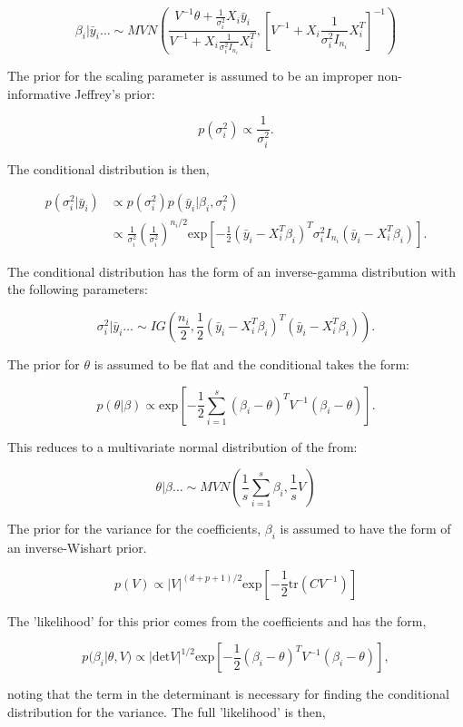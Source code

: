 \documentclass[11pt]{article}
\begin{document}
    $$\beta_i | \bar{y}_i \dots \sim MVN\left(\frac{V^{-1} \theta + \frac{1}{\sigma_i^2 }X_i \bar{y}_i }{V^{-1} + X_i \frac{1}{\sigma_i^2 I_{n_i}} X_i^T}, \left[V^{-1} + X_i \frac{1}{\sigma_i^2 I_{n_i}} X_i^T \right]^{-1} \right)$$

    The prior for the scaling parameter is assumed to be an improper non-informative Jeffrey's prior:

    $$p(\sigma_i^2) \propto \frac{1}{\sigma_i^2}.$$

    \noindent The conditional distribution is then,

    \begin{align*}
    p(\sigma_i^2| \bar{y}_i) &\propto p(\sigma_i^2) p(\bar{y}_i | \beta_i, \sigma_i^2) \\
    & \propto \frac{1}{\sigma_i^2} \left(\frac{1}{\sigma_i^2}\right)^{n_i/2} \text{exp}\left[ -\frac{1}{2} (\bar{y}_i - X_i^T \beta_i)^T \sigma_i^2 I_{n_i} (\bar{y}_i - X_i^T \beta_i)\right].
    \end{align*}

    \noindent The conditional distribution has the form of an inverse-gamma distribution with the following parameters:

    $$\sigma_i^2 | \bar{y}_i \dots \sim IG\left(\frac{n_i}{2},  \frac{1}{2} (\bar{y}_i - X_i^T \beta_i)^T (\bar{y}_i - X_i^T \beta_i)\right).$$

    The prior for $\theta$ is assumed to be flat and the conditional takes the form:

    $$p(\theta | \beta) \propto \text{exp} \left[-\frac{1}{2} \sum_{i=1}^s (\beta_i - \theta)^T V^{-1} (\beta_i - \theta) \right].$$

    This reduces to a multivariate normal distribution of the from:

    $$\theta | \beta \dots \sim MVN \left(\frac{1}{s} \sum_{i=1}^s \beta_i, \frac{1}{s}V \right)$$

    The prior for the variance for the coefficients, $\beta_i$ is assumed to have the form of an inverse-Wishart prior.

    $$p(V) \propto |V|^{(d+p+1)/2} \text{exp}\left[-\frac{1}{2} \text{tr}(C V^{-1}) \right]$$

    The 'likelihood' for this prior comes from the coefficients and has the form,

    $$p(\beta_i | \theta, V) \propto | \text{det} V |^{1/2} \text{exp}\left[-\frac{1}{2} (\beta_i - \theta)^T V^{-1} (\beta_i - \theta) \right],$$

    \noindent noting that the term in the determinant is necessary for finding the conditional distribution for the variance. The full 'likelihood' is then,
\end{document}
